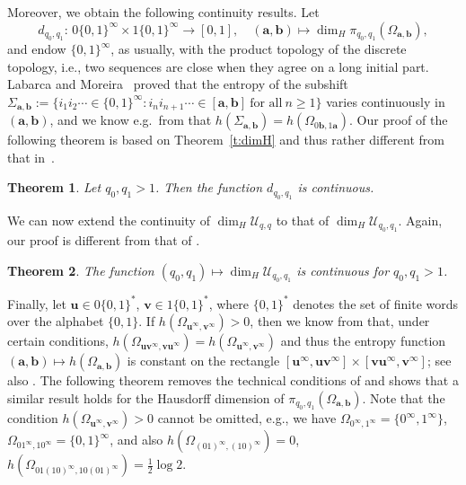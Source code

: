 \documentclass{amsart}
\newtheorem{theorem}{Theorem}[section]
\theoremstyle{definition}
\numberwithin{equation}{section}
\newcommand{\ba}{\mathbf{a}}
\newcommand{\bb}{\mathbf{b}}
\newcommand{\bu}{\mathbf{u}}
\newcommand{\bv}{\mathbf{v}}
\newcommand{\cU}{\mathcal{U}}
\begin{document}
Moreover, we obtain the following continuity results. 
Let
\[
d_{q_0,q_1}:\, 0\{0,1\}^\infty \times 1\{0,1\}^\infty \to [0,1], \quad (\ba,\bb) \mapsto \dim_H \pi_{q_0,q_1}(\Omega_{\ba,\bb}),
\]
and endow $\{0,1\}^\infty$, as usually, with the product topology of the discrete topology, i.e., two sequences are close when they agree on a long initial part. 
Labarca and Moreira~\cite{LabMor2006} proved that the entropy of the subshift $\Sigma_{\ba,\bb} := \{i_1i_2\cdots \in \{0,1\}^\infty  : i_ni_{n+1}\cdots \in [\ba,\bb]\ \mbox{for all}\ n \ge 1\}$ varies continuously in $(\ba,\bb)$, and we know e.g.\ from \cite[Theorem~2.6]{KomSteZou2022} that $h(\Sigma_{\ba,\bb}) = h(\Omega_{0\bb,1\ba})$.
Our proof of the following theorem is based on Theorem~\ref{t:dimH} and thus rather different from that in~\cite{LabMor2006}. 

\begin{theorem}\label{t:t2a}
Let $q_0,q_1 > 1$. 
Then the function $d_{q_0,q_1}$ is continuous.
\end{theorem}

We can now extend the continuity of $\dim_H \cU_{q,q}$ to that of $\dim_H \cU_{q_0,q_1}$. 
Again, our proof is different from that of \cite{KomKonLi2017,AllKong2019}.

\begin{theorem}\label{t:t2}
The function $(q_0,q_1) \mapsto \dim_H \cU_{q_0,q_1}$ is continuous for $q_0,q_1 > 1$.
\end{theorem}

Finally, let $\bu \in 0\{0,1\}^*$, $\bv \in 1\{0,1\}^*$, where $\{0,1\}^*$ denotes the set of finite words over the alphabet $\{0,1\}$.
If $h(\Omega_{\bu^\infty,\bv^\infty}) > 0$, then we know from \cite[Lemma~8]{BarSteVin2014} that, under certain conditions, $h(\Omega_{\bu\bv^\infty,\bv\bu^\infty}) = h(\Omega_{\bu^\infty,\bv^\infty})$ and thus the entropy function $(\ba,\bb) \mapsto h(\Omega_{\ba,\bb})$ is constant on the rectangle $[\bu^\infty, \bu\bv^\infty]\times [\bv\bu^\infty, \bv^\infty]$; see also \cite[Theorem~3]{SilSR2002}.
The following theorem removes the technical conditions of \cite[Lemma~8]{BarSteVin2014} and shows that a similar result holds for the Hausdorff dimension of $\pi_{q_0, q_1}(\Omega_{\ba, \bb})$.
Note that the condition $h(\Omega_{\bu^\infty,\bv^\infty}) > 0$ cannot be omitted, e.g., we have $\Omega_{0^\infty,1^\infty} = \{0^\infty,1^\infty\}$, $\Omega_{01^\infty,10^\infty} = \{0,1\}^\infty$, and also $h(\Omega_{(01)^\infty,(10)^\infty}) = 0$, $h(\Omega_{01(10)^\infty,10(01)^\infty}) = \frac{1}{2} \log 2$.
\end{document}
